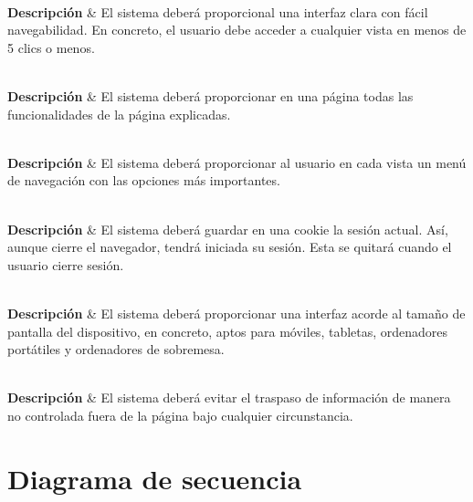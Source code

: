 {
     \\
    \hline
    \textbf{Descripción} & El sistema deberá proporcional una interfaz clara con fácil navegabilidad. En concreto, el usuario debe acceder a cualquier vista en menos de 5 clics o menos. \\
}

{
     \\
    \hline
    \textbf{Descripción} & El sistema deberá proporcionar en una página todas las funcionalidades de la página explicadas. \\
}

{
     \\
    \hline
    \textbf{Descripción} & El sistema deberá proporcionar al usuario en cada vista un menú de navegación con las opciones más importantes. \\
}

{
     \\
    \hline
    \textbf{Descripción} & El sistema deberá guardar en una cookie la sesión actual. Así, aunque cierre el navegador, tendrá iniciada su sesión. Esta se quitará cuando el usuario cierre sesión. \\
}

{
     \\
    \hline
    \textbf{Descripción} & El sistema deberá proporcionar una interfaz acorde al tamaño de pantalla del dispositivo, en concreto, aptos para móviles, tabletas, ordenadores portátiles y ordenadores de sobremesa. \\
}

{
     \\
    \hline
    \textbf{Descripción} & El sistema deberá evitar el traspaso de información de manera no controlada fuera de la página bajo cualquier circunstancia. \\
}


\section{Diagrama de secuencia}\label{sec:diagrama_secuencia}


